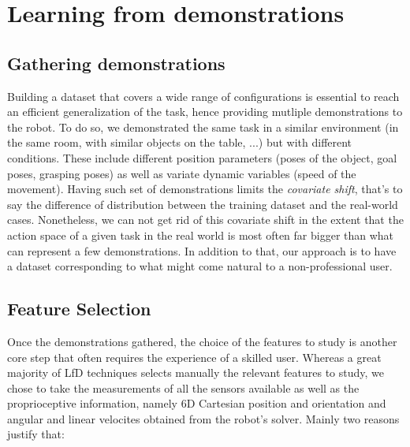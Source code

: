 \documentclass[a4paper, 10pt, conference]{ieeeconf}
\begin{document}
\section{Learning from demonstrations}\label{LfD}

\subsection{Gathering demonstrations}


Building a dataset that covers a wide range of configurations is essential to reach an efficient generalization of the task, hence providing mutliple demonstrations to the robot. To do so, we demonstrated the same task in a similar environment (in the same room, with similar objects on the table, ...) but with different conditions. These include different position parameters (poses of the object, goal poses, grasping poses) as well as variate dynamic variables (speed of the movement). Having such set of demonstrations limits the \textit{covariate  shift}, that's to say the difference of distribution between the training dataset and the real-world cases. Nonetheless, we can not get rid of  this covariate shift in the extent that the action space of a given task in the real world is most often far bigger than what can represent a few demonstrations. In addition to that, our approach is to have a dataset corresponding to what might come natural to a non-professional user.

\subsection{Feature Selection} \label{feature_selection}

Once the demonstrations gathered, the choice of the features to study is another core step that often requires the experience of a skilled user. Whereas a great majority of LfD techniques selects manually the relevant features to study, we chose to take the measurements of all the sensors available as well as the proprioceptive information, namely 6D Cartesian position and orientation and angular and linear velocites obtained from the robot's solver. Mainly two reasons justify that:
\end{document}
